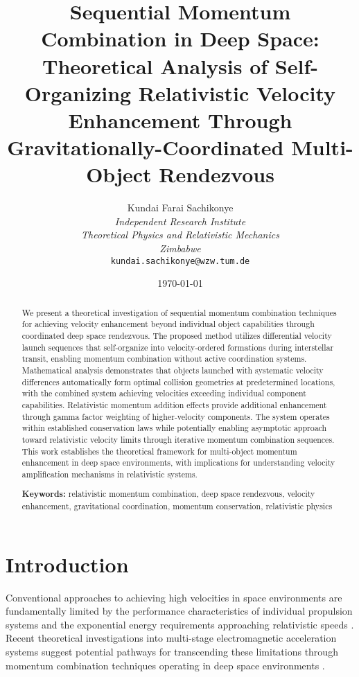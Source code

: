 \documentclass[11pt,a4paper]{article}
\title{Sequential Momentum Combination in Deep Space: Theoretical Analysis of Self-Organizing Relativistic Velocity Enhancement Through Gravitationally-Coordinated Multi-Object Rendezvous}
\author{
Kundai Farai Sachikonye\\
\textit{Independent Research Institute}\\
\textit{Theoretical Physics and Relativistic Mechanics}\\
\textit{Zimbabwe}\\
\texttt{kundai.sachikonye@wzw.tum.de}
}
\date{\today}
\theoremstyle{remark}
\begin{document}
\maketitle

\begin{abstract}
We present a theoretical investigation of sequential momentum combination techniques for achieving velocity enhancement beyond individual object capabilities through coordinated deep space rendezvous. The proposed method utilizes differential velocity launch sequences that self-organize into velocity-ordered formations during interstellar transit, enabling momentum combination without active coordination systems. Mathematical analysis demonstrates that objects launched with systematic velocity differences automatically form optimal collision geometries at predetermined locations, with the combined system achieving velocities exceeding individual component capabilities. Relativistic momentum addition effects provide additional enhancement through gamma factor weighting of higher-velocity components. The system operates within established conservation laws while potentially enabling asymptotic approach toward relativistic velocity limits through iterative momentum combination sequences. This work establishes the theoretical framework for multi-object momentum enhancement in deep space environments, with implications for understanding velocity amplification mechanisms in relativistic systems.

\textbf{Keywords:} relativistic momentum combination, deep space rendezvous, velocity enhancement, gravitational coordination, momentum conservation, relativistic physics
\end{abstract}

\section{Introduction}

Conventional approaches to achieving high velocities in space environments are fundamentally limited by the performance characteristics of individual propulsion systems and the exponential energy requirements approaching relativistic speeds \cite{misner1973gravitation, weinberg1972gravitation}. Recent theoretical investigations into multi-stage electromagnetic acceleration systems suggest potential pathways for transcending these limitations through momentum combination techniques operating in deep space environments \cite{jackson1999classical}.
\end{document}
